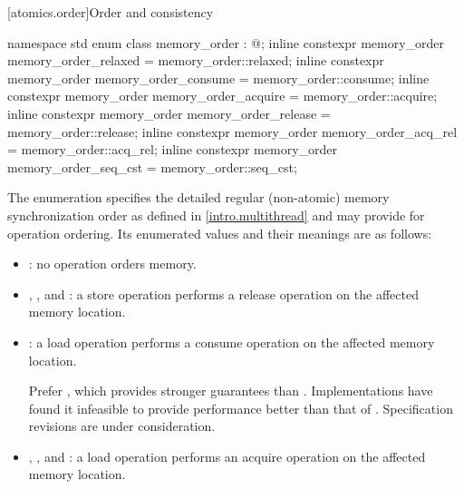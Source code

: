 [atomics.order]{Order and consistency}
%
%
%
%
%
%
%
%
%
%
%
%
%

\begin{codeblock}
namespace std {
  enum class memory_order : @;
  inline constexpr memory_order memory_order_relaxed = memory_order::relaxed;
  inline constexpr memory_order memory_order_consume = memory_order::consume;
  inline constexpr memory_order memory_order_acquire = memory_order::acquire;
  inline constexpr memory_order memory_order_release = memory_order::release;
  inline constexpr memory_order memory_order_acq_rel = memory_order::acq_rel;
  inline constexpr memory_order memory_order_seq_cst = memory_order::seq_cst;
}
\end{codeblock}

\pnum
The enumeration  specifies the detailed regular
(non-atomic) memory synchronization order as defined in
\ref{intro.multithread} and may provide for operation ordering. Its
enumerated values and their meanings are as follows:
\begin{itemize}
\item {}: no operation orders memory.

\item {}, , and
: a store operation performs a release operation on the
affected memory location.

\item {}: a load operation performs a consume operation on the
affected memory location.
\begin{note}
Prefer , which provides stronger guarantees
than . Implementations have found it infeasible
to provide performance better than that of .
Specification revisions are under consideration.
\end{note}

\item {}, , and
: a load operation performs an acquire operation on the
affected memory location.
\end{itemize}

